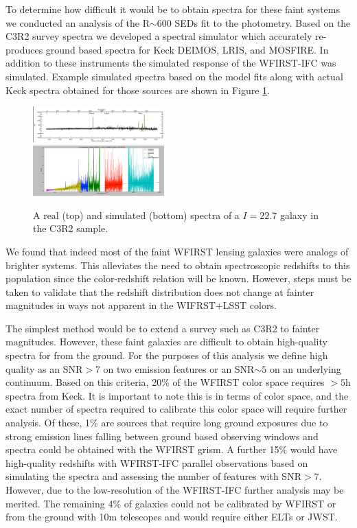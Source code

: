 To determine how difficult it would be to obtain spectra for these faint systems
we conducted an analysis of the R$\sim$600 SEDs fit to the photometry.  Based on
the C3R2 survey spectra \citep{Masters2017} we developed a spectral simulator
which accurately re-produces ground based spectra for Keck DEIMOS, LRIS, and
MOSFIRE.  In addition to these instruments the simulated response of the
WFIRST-IFC was simulated.  Example simulated spectra based on the model fits
along with actual Keck spectra obtained for those sources are shown in Figure
\ref{fig:SpecSim}.

\begin{figure}
\centering
 \includegraphics[trim=0cm 0cm 0cm 0cm, clip,width=0.45\textwidth] {./plots/realspec.png}\\
   \includegraphics[trim=0cm 0cm 0cm 0cm, clip,width=0.45\textwidth] {./plots/simspec.png}

\caption{ A real (top) and simulated (bottom) spectra of a $I=22.7$ galaxy in the C3R2 sample.}
\label{fig:SpecSim}
\end{figure}

We found that indeed most of the faint WFIRST lensing galaxies were analogs of
brighter systems. This alleviates the need to obtain spectroscopic redshifts to
this population since the color-redshift relation will be known.  However, steps
must be taken to validate that the redshift distribution does not change at
fainter magnitudes in ways not apparent in the WIFRST+LSST colors.

The simplest method would be to extend a survey such as C3R2 \citep{Masters2017}
to fainter magnitudes. However, these faint galaxies are difficult to obtain
high-quality spectra for from the ground.  For the purposes of this analysis we
define high quality as an SNR$>$7 on two emission features or an SNR$\sim5$ on
an underlying continuum.  Based on this criteria, 20\% of the WFIRST color space
requires $>5$h spectra from Keck.  It is important to note this is in terms of
color space, and the exact number of spectra required to calibrate this color
space will require further analysis.   Of these, 1\% are sources that require
long ground exposures due to strong emission lines falling between ground based
observing windows and spectra could be obtained with the WFIRST grism.  A
further 15\% would have high-quality redshifts with WFIRST-IFC parallel
observations based on simulating the spectra and assessing the number of
features with SNR$>$7.  However, due to the low-resolution of the WFIRST-IFC
further analysis may be merited.   The remaining 4\% of galaxies could not be
calibrated by WFIRST or from the ground with 10m telescopes and would require
either ELTs or JWST.

